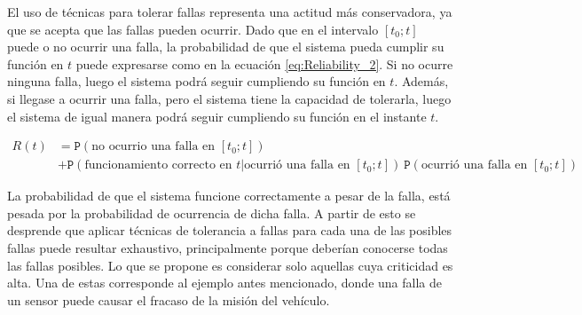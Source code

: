El uso de técnicas para tolerar fallas representa una actitud más conservadora, ya que se acepta que las fallas pueden ocurrir. Dado que en el intervalo $[t_0;t]$ puede o no ocurrir una falla, la probabilidad de que el sistema pueda cumplir su función en $t$ puede expresarse como en la ecuación \eqref{eq:Reliability_2}. Si no ocurre ninguna falla, luego el sistema podrá seguir cumpliendo su función en $t$. Además, si llegase a ocurrir una falla, pero el sistema tiene la capacidad de tolerarla, luego el sistema de igual manera podrá seguir cumpliendo su función en el instante $t$.

\begin{equation}
    \begin{aligned}
        R(t) &= \mathtt{P}\left( \text{no ocurrio una falla en $[t_0;t]$} \right)\\ &+ \mathtt{P}\left( \text{funcionamiento correcto en $t$}|\text{ocurrió una falla en $[t_0;t]$} \right) \ \mathtt{P}\left( \text{ocurrió una falla en $[t_0;t]$} \right)
    \end{aligned}
    \label{eq:Reliability_2}
\end{equation}

La probabilidad de que el sistema funcione correctamente a pesar de la falla, está pesada por la probabilidad de ocurrencia de dicha falla. A partir de esto se desprende que aplicar técnicas de tolerancia a fallas para cada una de las posibles fallas puede resultar exhaustivo, principalmente porque deberían conocerse todas las fallas posibles. Lo que se propone es considerar solo aquellas cuya criticidad es alta. Una de estas corresponde al ejemplo antes mencionado, donde una falla de un sensor puede causar el fracaso de la misión del vehículo.



